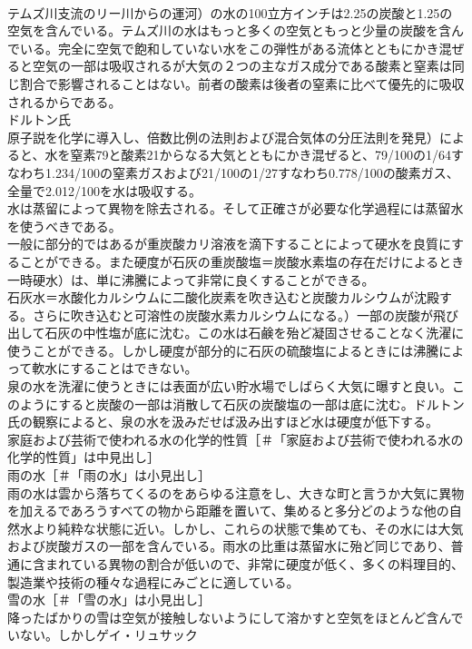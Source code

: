 \documentclass[8pt]{extreport}
\begin{document}
\begin{CJK}{UTF8}{min}
\\	テムズ川支流のリー川からの運河）の水の100立方インチは2.25の炭酸と1.25の空気を含んでいる。テムズ川の水はもっと多くの空気ともっと少量の炭酸を含んでいる。完全に空気で飽和していない水をこの弾性がある流体とともにかき混ぜると空気の一部は吸収されるが大気の２つの主なガス成分である酸素と窒素は同じ割合で影響されることはない。前者の酸素は後者の窒素に比べて優先的に吸収されるからである。
\\	ドルトン氏
\\	原子説を化学に導入し、倍数比例の法則および混合気体の分圧法則を発見）によると、水を窒素79と酸素21からなる大気とともにかき混ぜると、79/100の1/64すなわち1.234/100の窒素ガスおよび21/100の1/27すなわち0.778/100の酸素ガス、全量で2.012/100を水は吸収する。
\\	水は蒸留によって異物を除去される。そして正確さが必要な化学過程には蒸留水を使うべきである。
\\	一般に部分的ではあるが重炭酸カリ溶液を滴下することによって硬水を良質にすることができる。また硬度が石灰の重炭酸塩＝炭酸水素塩の存在だけによるとき
\\	一時硬水）は、単に沸騰によって非常に良くすることができる。
\\	石灰水＝水酸化カルシウムに二酸化炭素を吹き込むと炭酸カルシウムが沈殿する。さらに吹き込むと可溶性の炭酸水素カルシウムになる。）一部の炭酸が飛び出して石灰の中性塩が底に沈む。この水は石鹸を殆ど凝固させることなく洗濯に使うことができる。しかし硬度が部分的に石灰の硫酸塩によるときには沸騰によって軟水にすることはできない。
\\	泉の水を洗濯に使うときには表面が広い貯水場でしばらく大気に曝すと良い。このようにすると炭酸の一部は消散して石灰の炭酸塩の一部は底に沈む。ドルトン氏の観察によると、泉の水を汲みだせば汲み出すほど水は硬度が低下する。
\\	家庭および芸術で使われる水の化学的性質［＃「家庭および芸術で使われる水の化学的性質」は中見出し］
\\	雨の水［＃「雨の水」は小見出し］
\\	雨の水は雲から落ちてくるのをあらゆる注意をし、大きな町と言うか大気に異物を加えるであろうすべての物から距離を置いて、集めると多分どのような他の自然水より純粋な状態に近い。しかし、これらの状態で集めても、その水には大気および炭酸ガスの一部を含んでいる。雨水の比重は蒸留水に殆ど同じであり、普通に含まれている異物の割合が低いので、非常に硬度が低く、多くの料理目的、製造業や技術の種々な過程にみごとに適している。
\\	雪の水［＃「雪の水」は小見出し］
\\	降ったばかりの雪は空気が接触しないようにして溶かすと空気をほとんど含んでいない。しかしゲイ・リュサック

\end{CJK}
\end{document}
